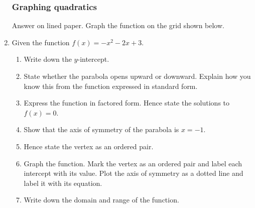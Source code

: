 \documentclass[12pt, oneside]{article}
\begin{document}
\begin{enumerate}
\subsubsection*{Graphing quadratics}
Answer on lined paper. Graph the function on the grid shown below.
\item Given the function $f(x)=-x^2-2x+3$.
\begin{enumerate}
    \item Write down the $y$-intercept.
    \item State whether the parabola opens upward or downward. Explain how you know this from the function expressed in standard form.
    \item Express the function in factored form. Hence state the solutions to $f(x)=0$.
    \item Show that the axis of symmetry of the parabola is $x=-1$.
    \item Hence state the vertex as an ordered pair.
    \item Graph the function. Mark the vertex as an ordered pair and label each intercept with its value. Plot the axis of symmetry as a dotted line and label it with its equation.
    \item Write down the domain and range of the function.
\end{enumerate}


\begin{center} %
\end{center}


\end{enumerate}

 
\end{document}
